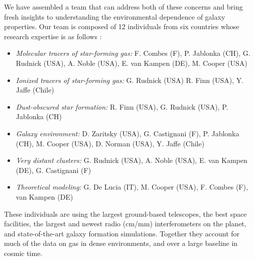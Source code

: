 \documentclass[11pt]{article}
\begin{document}

We have assembled a team that can address both of these concerns and bring fresh insights to understanding the environmental dependence of galaxy properties. Our team is composed of 12 individuals from six countries whose research expertise is as follows :
\vspace{-0.1in}
\begin{itemize} 
\item \textit{Molecular tracers of star-forming gas:} F. Combes (F), P. Jablonka (CH), G. Rudnick (USA),
A. Noble (USA), E. van Kampen (DE), M. Cooper (USA)
\vspace{-0.1in}
\item \textit{Ionized tracers of star-forming gas:} G. Rudnick (USA) R. Finn (USA), Y. Jaffe (Chile) 
\vspace{-0.1in}
\item \textit{Dust-obscured star formation:} R. Finn (USA), G. Rudnick (USA), P. Jablonka (CH)
\vspace{-0.1in}
\item \textit{Galaxy environment:} D. Zaritsky (USA), G. Castignani (F), P. Jablonka (CH), M. Cooper (USA), D. Norman (USA), Y. Jaffe (Chile)
\vspace{-0.1in}
\item \textit{Very distant clusters:} G. Rudnick (USA), A. Noble (USA), E. van Kampen (DE), G. Castignani (F) 
\vspace{-0.1in}
\item \textit{Theoretical modeling:} G. De Lucia (IT), M. Cooper (USA), F. Combes (F), van Kampen (DE)
\end{itemize}
These individuals are using the largest ground-based telescopes, the best space facilities, the largest and newest radio (cm/mm) interferometers on the planet, and state-of-the-art galaxy formation simulations.  Together they account for much of the data on gas in dense environments, and over a large baseline in cosmic time.  
\end{document}
